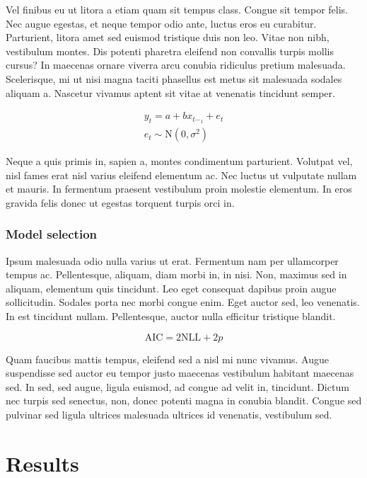 \documentclass[11pt,]{report}
\begin{document}
Vel finibus eu ut litora a etiam quam sit tempus class. Congue sit
tempor felis. Nec augue egestas, et neque tempor odio ante, luctus eros
eu curabitur. Parturient, litora amet sed euismod tristique duis non
leo. Vitae non nibh, vestibulum montes. Dis potenti pharetra eleifend
non convallis turpis mollis cursus? In maecenas ornare viverra arcu
conubia ridiculus pretium malesuada. Scelerisque, mi ut nisi magna
taciti phasellus est metus sit malesuada sodales aliquam a. Nascetur
vivamus aptent sit vitae at venenatis tincidunt semper.

\[\begin{align*}
  y_{t}=a + bx_{t-_1} + e_{t} \\
  e_{t}\sim \text{N}(0, \sigma^2) 
\end{align*}\]

Neque a quis primis in, sapien a, montes condimentum parturient.
Volutpat vel, nisl fames erat nisl varius eleifend elementum ac. Nec
luctus ut vulputate nullam et mauris. In fermentum praesent vestibulum
proin molestie elementum. In eros gravida felis donec ut egestas
torquent turpis orci in.

\hypertarget{model-selection}{%
\subsection{Model selection}\label{model-selection}}

Ipsum malesuada odio nulla varius ut erat. Fermentum nam per ullamcorper
tempus ac. Pellentesque, aliquam, diam morbi in, in nisi. Non, maximus
sed in aliquam, elementum quis tincidunt. Leo eget consequat dapibus
proin augue sollicitudin. Sodales porta nec morbi congue enim. Eget
auctor sed, leo venenatis. In est tincidunt nullam. Pellentesque, auctor
nulla efficitur tristique blandit.

\[\begin{equation}
  \text{AIC}=\text{2NLL} + 2p
\end{equation}\]

Quam faucibus mattis tempus, eleifend sed a nisl mi nunc vivamus. Augue
suspendisse sed auctor eu tempor justo maecenas vestibulum habitant
maecenas sed. In sed, sed augue, ligula euismod, ad congue ad velit in,
tincidunt. Dictum nec turpis sed senectus, non, donec potenti magna in
conubia blandit. Congue sed pulvinar sed ligula ultrices malesuada
ultrices id venenatis, vestibulum sed.

\hypertarget{results}{%
\chapter{Results}\label{results}}
\end{document}
